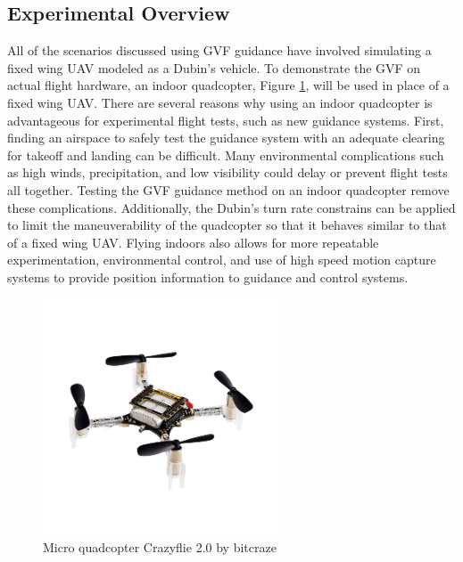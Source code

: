 \documentclass[numbered,pdftex]{ohio-etd}
\begin{document}
\subsection{Experimental Overview}
All of the scenarios discussed using GVF guidance have involved simulating a fixed wing UAV modeled as a Dubin's vehicle. To demonstrate the GVF on actual flight hardware, an indoor quadcopter, Figure \ref{fig:crazyflie2}, will be used in place of a fixed wing UAV. There are several reasons why using an indoor quadcopter is advantageous for experimental flight tests, such as new guidance systems. First, finding an airspace to safely test the guidance system with an adequate clearing for takeoff and landing can be difficult. Many environmental complications such as high winds, precipitation, and low visibility could delay or prevent flight tests all together. Testing the GVF guidance method on an indoor quadcopter remove these complications. Additionally, the Dubin's turn rate constrains can be applied to limit the maneuverability of the quadcopter so that it behaves similar to that of a fixed wing UAV. Flying indoors also allows for more repeatable experimentation, environmental control, and use of high speed motion capture systems to provide position information to guidance and control systems. 



\begin{figure}
	\centering
	\includegraphics[trim=0 25 0 30,clip,width=7cm]{PaperFigures/crazyflie}
	\caption{Micro quadcopter Crazyflie 2.0 by bitcraze}
	\label{fig:crazyflie2}
\end{figure}
\end{document}
